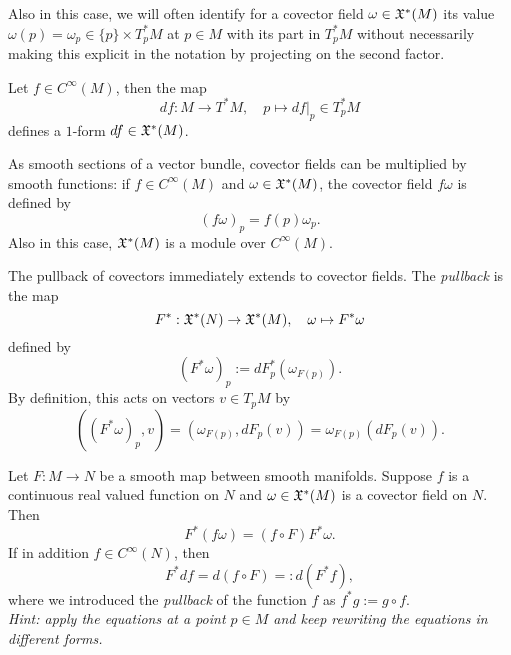 Also in this case, we will often identify for a covector field $\omega\in\mathfrak{X}^*(M)$ its value $\omega(p) = \omega_p \in \{p\}\times T^*_p M$ at $p\in M$ with its part in $T_p^*M$ without necessarily making this explicit in the notation by projecting on the second factor.

\begin{example}
  Let $f\in C^\infty(M)$, then the map
  \begin{equation}
    df : M \to T^*M, \quad p \mapsto df|_p \in T^*_p M
  \end{equation}
  defines a $1$-form $df\in\mathfrak{X}^*(M)$.
\end{example}

As smooth sections of a vector bundle, covector fields can be multiplied by smooth functions: if $f\in C^\infty(M)$ and $\omega\in\mathfrak{X}^*(M)$, the covector field $f\omega$ is defined by
\begin{equation}
  (f\omega)_p = f(p)\omega_p.
\end{equation}
Also in this case, $\mathfrak{X}^*(M)$ is a module over $C^\infty(M)$.

\begin{definition}
  The pullback of covectors immediately extends to covector fields.
  The \emph{pullback} is the map
  \begin{equation}
    F^*: \mathfrak{X}^*(N) \to \mathfrak{X}^*(M), \quad \omega \mapsto F^* \omega
  \end{equation} 
  defined by
  \begin{equation}
    (F^*\omega)_p := dF_p^*(\omega_{F(p)}).
  \end{equation}
  By definition, this acts on vectors $v\in T_p M$ by
  \begin{equation}
    ((F^*\omega)_p, v) = (\omega_{F(p)}, dF_p(v)) = \omega_{F(p)}(dF_p(v)).
  \end{equation}
\end{definition}

\begin{exercise}\label{ex:propdiff}
  Let $F:M\to N$ be a smooth map between smooth manifolds.
  Suppose $f$ is a continuous real valued function on $N$ and $\omega\in\mathfrak{X}^*(M)$ is a covector field on $N$. Then
  \begin{equation}
    F^*(f\omega) = (f\circ F)F^*\omega.
  \end{equation}
  If in addition $f\in C^\infty(N)$, then
  \begin{equation}
    F^* df = d (f\circ F) =: d (F^* f),
  \end{equation}
  where we introduced the \emph{pullback} of the function $f$ as $f^*g := g\circ f$.\\
 \textit{\small Hint: apply the equations at a point $p\in M$ and keep rewriting the equations in different forms.}
\end{exercise}

